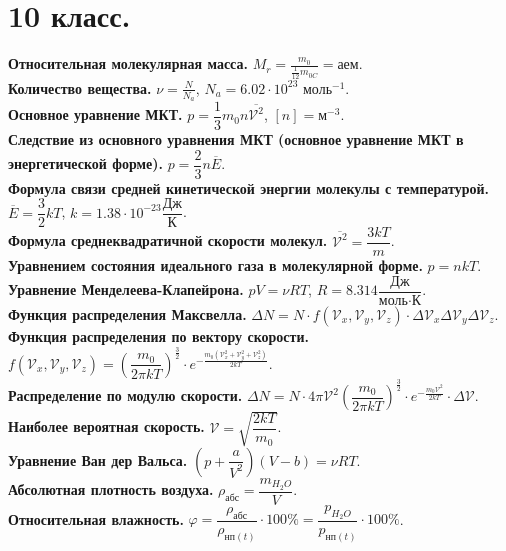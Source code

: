 \documentclass[12pt]{article}
\begin{document}
	\section{10 класс.}
	\textbf{Относительная молекулярная масса.} $M_r = \frac{m_0}{\frac{1}{12} m_{0C}} = \text{аем}$.\\
	\textbf{Количество вещества.} $\nu = \frac{N}{N_a}$, $N_a = 6.02 \cdot 10^{23} \text{ моль}^{-1}$.\\
	\textbf{Основное уравнение МКТ.} $p = \dfrac{1}{3} m_0 n \overline{\mathcal{V}^2}$, $[n] = \text{м}^{-3}$.\\
	\textbf{Следствие из основного уравнения МКТ (основное уравнение МКТ в энергетической форме).} $p = \dfrac{2}{3} n \overline{E}$.\\
	\textbf{Формула связи средней кинетической энергии молекулы с температурой.} $\overline{E} = \dfrac{3}{2}kT$, $k = 1.38 \cdot 10^{-23} \dfrac{\text{Дж}}{\text{К}}$.\\
	\textbf{Формула среднеквадратичной скорости молекул.} $\overline{\mathcal{V}^2} = \dfrac{3kT}{m}$.\\
	\textbf{Уравнением состояния идеального газа в молекулярной форме.} $p = nkT$.\\
	\textbf{Уравнение Менделеева-Клапейрона.} $pV = \nu RT$, $R = 8.314 \dfrac{\text{Дж}}{\text{моль} \cdot \text{К}}$.\\
	\textbf{Функция распределения Максвелла.} $\varDelta N = N \cdot f(\mathcal{V}_x, \mathcal{V}_y, \mathcal{V}_z) \cdot \varDelta \mathcal{V}_x \varDelta \mathcal{V}_y \varDelta \mathcal{V}_z$.\\
	\textbf{Функция распределения по вектору скорости.} $f(\mathcal{V}_x, \mathcal{V}_y, \mathcal{V}_z) = \left( \dfrac{m_0}{2 \pi kT} \right)^{\frac{3}{2}} \cdot e^{- \frac{m_0(\mathcal{V}_x^2 + \mathcal{V}_y^2 + \mathcal{V}_z^2)}{2kT}}$.\\
	\textbf{Распределение по модулю скорости.} $\varDelta N = N \cdot 4 \pi \mathcal{V}^2 \left( \dfrac{m_0}{2 \pi kT} \right)^{\frac{3}{2}} \cdot e^{- \frac{m_0\mathcal{V}^2}{2kT}} \cdot \varDelta \mathcal{V}$.\\
	\textbf{Наиболее вероятная скорость.} $\mathcal{V} = \sqrt{\dfrac{2kT}{m_0}}$.\\
	\textbf{Уравнение Ван дер Вальса.} $(p + \dfrac{a}{V^2})(V - b) = \nu RT$.\\
	\textbf{Абсолютная плотность воздуха.} $\rho_{\text{абс}} = \dfrac{m_{H_2O}}{V}$.\\
	\textbf{Относительная влажность.} $\varphi = \dfrac{\rho_{\text{абс}}}{\rho_{\text{нп}(t)}} \cdot 100 \% = \dfrac{p_{H_2O}}{p_{\text{нп}(t)}} \cdot 100 \%$.\\
\end{document}

